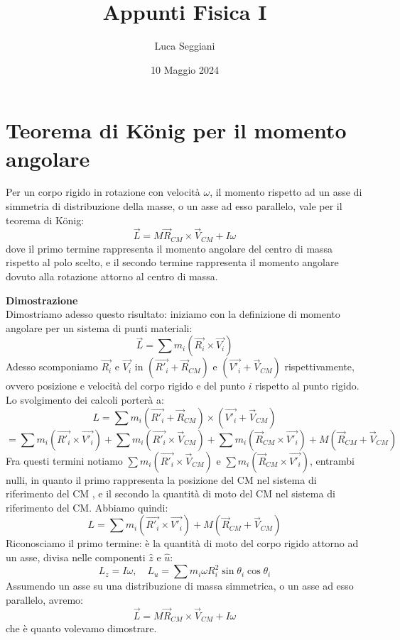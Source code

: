 \documentclass[a4paper,12pt]{article}
\title{Appunti Fisica I}
\author{Luca Seggiani}
\date{10 Maggio 2024}
\begin{document}
\maketitle
\section{Teorema di König per il momento angolare}
Per un corpo rigido in rotazione con velocità $\omega$, il momento rispetto ad un asse di simmetria di distribuzione
della masse, o un asse ad esso parallelo, vale per il teorema di König:
$$ \vec{L} = M\vec{R}_{CM} \times \vec{V}_{CM} + I\omega$$
dove il primo termine rappresenta il momento angolare del centro di massa rispetto al polo scelto, e il secondo termine rappresenta
il momento angolare dovuto alla rotazione attorno al centro di massa.
\par\smallskip
\textbf{Dimostrazione} \\
Dimostriamo adesso questo risultato: iniziamo con la definizione di momento angolare per un sistema di punti materiali:
$$ \vec{L} = \sum m_i(\vec{R_i} \times \vec{V_i}) $$
Adesso scomponiamo $\vec{R_i}$ e $\vec{V_i}$ in $(\vec{R'_i} + \vec{R}_{CM})$ e $(\vec{V'_i} + \vec{V}_{CM})$ rispettivamente,
ovvero posizione e velocità del corpo rigido e del punto $i$ rispetto al punto rigido. Lo svolgimento dei calcoli porterà a:
$$ L = \sum m_i (\vec{R'_i} + \vec{R}_{CM}) \times (\vec{V'_i} + \vec{V}_{CM}) $$
$$ = \sum m_i (\vec{R'_i} \times \vec{V'_i}) + \sum m_i(\vec{R'_i} \times \vec{V}_{CM}) + \sum m_i ( \vec{R}_{CM} \times \vec{V'_i}) + M(\vec{R}_{CM} + \vec{V}_{CM}) $$
Fra questi termini notiamo $\sum m_i(\vec{R'_i} \times \vec{V}_{CM})$ e $\sum m_i ( \vec{R}_{CM} \times \vec{V'_i})$, entrambi nulli, in quanto il primo rappresenta
la posizione del CM nel sistema di riferimento del CM , e il secondo la quantità di moto del CM nel sistema di riferimento del CM. Abbiamo quindi:
$$ L =  \sum m_i (\vec{R'_i} \times \vec{V'_i})  + M(\vec{R}_{CM} + \vec{V}_{CM}) $$
Riconosciamo il primo termine: è la quantità di moto del corpo rigido attorno ad un asse, divisa nelle componenti $\hat{z}$ e $\hat{u}$:
$$ L_z = I\omega, \quad L_u = \sum m_i\omega R_i^2 \sin{\theta_i} \cos{\theta_i} $$
Assumendo un asse su una distribuzione di massa simmetrica, o un asse ad esso parallelo, avremo:
$$ \vec{L} = M\vec{R}_{CM} \times \vec{V}_{CM} + I\omega$$
che è quanto volevamo dimostrare.
\end{document}
